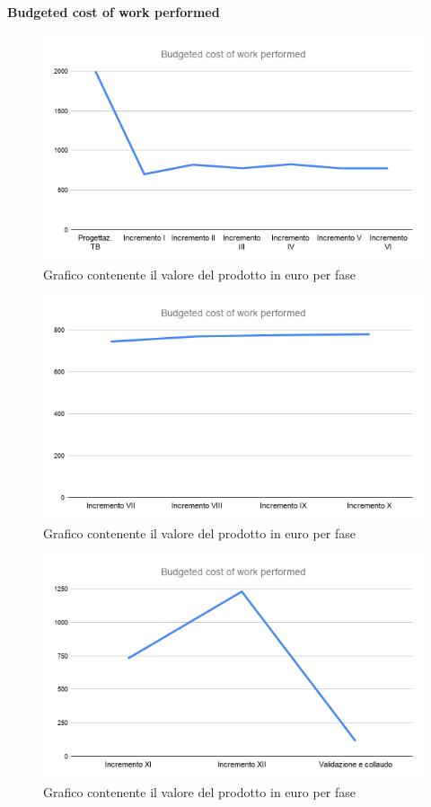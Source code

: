 	\paragraph{Budgeted cost of work performed}
		\begin{figure}[H]
			\centering
			\includegraphics[width=0.8\linewidth]{./res/images/BCWP_1.png}
			\caption{Grafico contenente il valore del prodotto in euro per fase}
			\label{fig:Grafico contenente il valore del prodotto in euro per fase}
		\end{figure}
		\begin{figure}[H]
			\centering
			\includegraphics[width=0.8\linewidth]{./res/images/BCWP_2.png}
			\caption{Grafico contenente il valore del prodotto in euro per fase}
			\label{fig:Grafico contenente il valore del prodotto in euro per fase}
		\end{figure}
		\begin{figure}[H]
			\centering
			\includegraphics[width=0.8\linewidth]{./res/images/BCWP_3.png}
			\caption{Grafico contenente il valore del prodotto in euro per fase}
			\label{fig:Grafico contenente il valore del prodotto in euro per fase}
		\end{figure}

